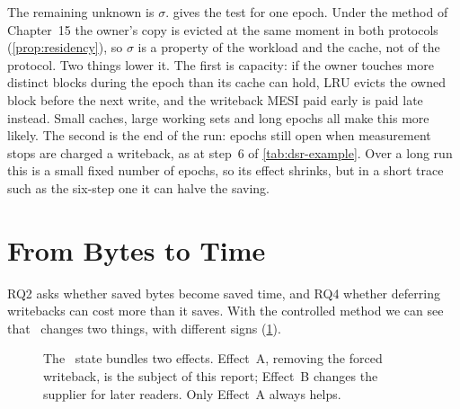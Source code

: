 The remaining unknown is $\sigma$.  gives the test for one
epoch. Under the method of Chapter~15 the owner's copy is evicted at the same moment
in both protocols (\cref{prop:residency}), so $\sigma$ is a property of the workload
and the cache, not of the protocol. Two things lower it. The first is capacity: if
the owner touches more distinct blocks during the epoch than its cache can hold, LRU
evicts the owned block before the next write, and the writeback MESI paid early is
paid late instead. Small caches, large working sets and long epochs all make this
more likely. The second is the end of the run: epochs still open when measurement
stops are charged a writeback, as at step~6 of \cref{tab:dsr-example}. Over a long
run this is a small fixed number of epochs, so its effect shrinks, but in a short
trace such as the six-step one it can halve the saving.

\section{From Bytes to Time}
\label{sec:dsr-time}
%

RQ2 asks whether saved bytes become saved time, and RQ4 whether deferring
writebacks can cost more than it saves. With the controlled method we can see that
\stO\ changes two things, with different signs (\cref{fig:two-effects}).

\begin{figure}[htbp]
\centering
{}
\caption[Two effects of the Owned state]{The \stO\ state bundles two effects.
Effect~A, removing the forced writeback, is the subject of this report; Effect~B
changes the supplier for later readers. Only Effect~A always helps.}
\label{fig:two-effects}
\end{figure}

